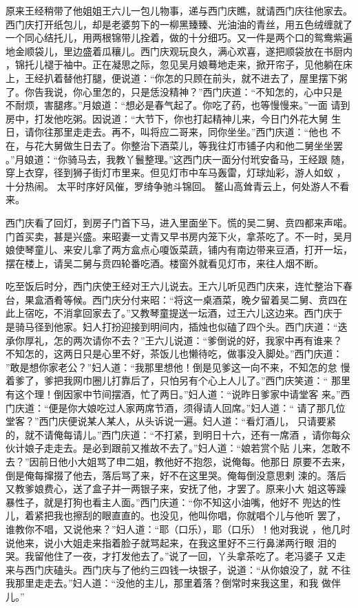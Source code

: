 原来王经稍带了他姐姐王六儿一包儿物事，递与西门庆瞧，就请西门庆往他家去。
西门庆打开纸包儿，却是老婆剪下的一柳黑臻臻、光油油的青丝，用五色绒缠就了
一个同心结托儿，用两根锦带儿拴着，做的十分细巧。又一件是两个口的鸳鸯紫遍
地金顺袋儿，里边盛着瓜穰儿。西门庆观玩良久，满心欢喜，遂把顺袋放在书厨内
，锦托儿褪于袖中。正在凝思之际，忽见吴月娘蓦地走来，掀开帘子，见他躺在床
上，王经扒着替他打腿，便说道：“你怎的只顾在前头，就不进去了，屋里摆下粥
了。你告我说，你心里怎的，只是恁没精神？”西门庆道：“不知怎的，心中只是
不耐烦，害腿疼。”月娘道：“想必是春气起了。你吃了药，也等慢慢来。”一面
请到房中，打发他吃粥。因说道：“大节下，你也打起精神儿来，今日门外花大舅
生日，请你往那里走走去。再不，叫将应二哥来，同你坐坐。”西门庆道：“他也
不在，与花大舅做生日去了。你整治下酒菜儿，等我往灯市铺子内和他二舅坐坐罢
。”月娘道：“你骑马去，我教丫鬟整理。”这西门庆一面分付玳安备马，王经跟
随，穿上衣穿，径到狮子街灯市里来。但见灯市中车马轰雷，灯球灿彩，游人如蚁
，十分热闹。
太平时序好风催，罗绮争驰斗锦回。
鳌山高耸青云上，何处游人不看来。

西门庆看了回灯，到房子门首下马，进入里面坐下。慌的吴二舅、贲四都来声喏。
门首买卖，甚是兴盛。来昭妻一丈青又早书房内笼下火，拿茶吃了。不一时，吴月
娘使琴童儿、来安儿拿了两方盒点心嗄饭菜蔬，铺内有南边带来豆酒，打开一坛，
摆在楼上，请吴二舅与贲四轮番吃酒。楼窗外就看见灯市，来往人烟不断。

吃至饭后时分，西门庆使王经对王六儿说去。王六儿听见西门庆来，连忙整治下春
台，果盒酒肴等候。西门庆分付来昭：“将这一桌酒菜，晚夕留着吴二舅、贲四在
此上宿吃，不消拿回家去了。”又教琴童提送一坛酒，过王六儿这边来。西门庆于
是骑马径到他家。妇人打扮迎接到明间内，插烛也似磕了四个头。西门庆道：“迭
承你厚礼，怎的两次请你不去？”王六儿说道：“爹倒说的好，我家中再有谁来？
不知怎的，这两日只是心里不好，茶饭儿也懒待吃，做事没入脚处。”西门庆道：
”敢是想你家老公？”妇人道：“我那里想他！倒是见爹这一向不来，不知怎的怠
慢着爹了，爹把我网巾圈儿打靠后了，只怕另有个心上人儿了。”西门庆笑道：“
那里有这个理！倒因家中节间摆酒，忙了两日。”妇人道：“说昨日爹家中请堂客
来。”西门庆道：“便是你大娘吃过人家两席节酒，须得请人回席。”妇人道：“
请了那几位堂客？”西门庆便说某人某人，从头诉说一遍。妇人道：“看灯酒儿，
只请要紧的，就不请俺每请儿。”西门庆道：“不打紧，到明日十六，还有一席酒
，请你每众伙计娘子走走去。是必到跟前又推故不去了。”妇人道：“娘若赏个贴
儿来，怎敢不去？”因前日他小大姐骂了申二姐，教他好不抱怨，说俺每。他那日
原要不去来，倒是俺每撺掇了他去，落后骂了来，好不在这里哭。俺每倒没意思剌
涑的。落后又教爹娘费心，送了盒子并一两银子来，安抚了他，才罢了。原来小大
姐这等躁暴性子，就是打狗也看主人面。”西门庆道：“你不知这小油嘴，他好不
兜达的性儿，着紧把我也擦刮的眼直直的。也没见，他叫你唱，你就唱个儿与他听
罢了，谁教你不唱，又说他来？”妇人道：“耶（口乐），耶（口乐）！他对我说
，他几时说他来，说小大姐走来指着脸子就骂起来，在我这里好不三行鼻涕两行眼
泪的哭。我留他住了一夜，才打发他去了。”说了一回，丫头拿茶吃了。老冯婆子
又走来与西门庆磕头。西门庆与了他约三四钱一块银子，说道：“从你娘没了，就
不往我那里走走去。”妇人道：“没他的主儿，那里着落？倒常时来我这里，和我
做伴儿。”

